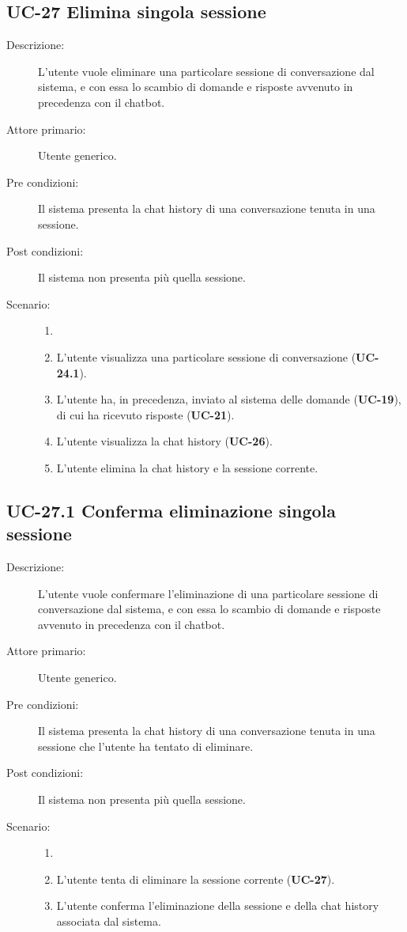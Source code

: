 \subsection{UC-27 Elimina singola sessione}
\begin{description}
    \item[Descrizione:] L'utente vuole eliminare una particolare sessione di conversazione dal sistema, e con essa lo scambio di domande e risposte avvenuto in precedenza con il chatbot.
    \item[Attore primario:] Utente generico.
    \item[Pre condizioni:] Il sistema presenta la chat history di una conversazione tenuta in una sessione.
    \item[Post condizioni:] Il sistema non presenta più quella sessione.
    \item[Scenario:]
    \begin{enumerate}
        \item[]
        \item L'utente visualizza una particolare sessione di conversazione (\textbf{UC-24.1}).
        \item L'utente ha, in precedenza, inviato al sistema delle domande (\textbf{UC-19}), di cui ha ricevuto risposte (\textbf{UC-21}).
        \item L'utente visualizza la chat history (\textbf{UC-26}).
        \item L'utente elimina la chat history e la sessione corrente.
    \end{enumerate}
\end{description}

\subsection{UC-27.1 Conferma eliminazione singola sessione}
\begin{description}
    \item[Descrizione:] L'utente vuole confermare l'eliminazione di una particolare sessione di conversazione dal sistema, e con essa lo scambio di domande e risposte avvenuto in precedenza con il chatbot.
    \item[Attore primario:] Utente generico.
    \item[Pre condizioni:] Il sistema presenta la chat history di una conversazione tenuta in una sessione che l'utente ha tentato di eliminare.
    \item[Post condizioni:] Il sistema non presenta più quella sessione.
    \item[Scenario:]
    \begin{enumerate}
        \item[]
        \item L'utente tenta di eliminare la sessione corrente (\textbf{UC-27}).
        \item L'utente conferma l'eliminazione della sessione e della chat history associata dal sistema.
    \end{enumerate}
\end{description}

